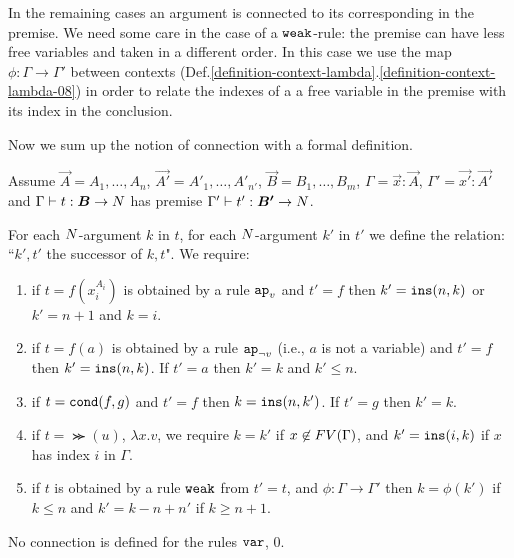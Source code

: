 In the remaining cases an argument is connected to its corresponding in the 
premise. We need some care in the case of a ${\tt weak}$-rule: the premise can
have less free variables and taken in a different order. 
In this case we use the map $\phi:\Gamma \rightarrow \Gamma'$ between contexts 
(Def.\ref{definition-context-lambda}.\ref{definition-context-lambda-08}) 
in order to relate the indexes of a a free variable in the premise with its index in the 
conclusion. 

Now we sum up the notion of connection with a formal definition.



\begin{definition}
Assume $\vec{A} = A_1, \ldots, A_n$, $\vec{A'} = A'_1, \ldots, A'_{n'}$,
$\vec{B}=B_1, \ldots, B_m$, $\Gamma = \vec{x}:\vec{A}$,
$\Gamma' = \vec{x'}:\vec{A'}$
and $\Gamma \vdash t:\vec{B} \rightarrow \N$
has premise $\Gamma' \vdash t':\vec{B'} \rightarrow \N$.


For each ${N}$-argument $k$ in $t$, for each ${N}$-argument $k'$ in $t'$ we define 
the relation: ``$k',t'$ the successor of $k,t$". We require:
\begin{enumerate}

\item
if $t=f(x_i^{A_i})$ is obtained by a rule $\apvar$ and $t'=f$ 
then $k' = {\tt ins}(n,k)$ or $k'=n+1$ and $k=i$.

\item
if $t=f(a)$ is obtained by a rule $\apnotvar$ (i.e., $a$ is not a variable) and $t'=f$ 
then $k' = {\tt ins}(n,k)$. If $t'=a$ then $k'=k$ and $k' \le n$.

\item
if $t={\tt cond}(f,g)$ and $t'=f$ 
then %
$k = {\tt ins}(n,k')$. 
If $t'=g$ then $k'=k$.

\item
if $t = \Succ(u)$, $\lambda x.v$, we require $k = k'$ if $x \not \in {{\relax FV}}(\Gamma)$,
and $k' = {\tt ins}(i,k)$ if $x$ has index $i$ in $\Gamma$.

\item
if $t$ is obtained by a rule ${\tt weak}$ from $t'=t$, and 
$\phi:\Gamma \rightarrow \Gamma'$ then $k = \phi(k')$ if $k \le n$
and $k' = k - n + n'$ if $k \ge n+1$.

\end{enumerate}
No connection is defined for the rules ${\tt var}$, $0$.
\end{definition}



